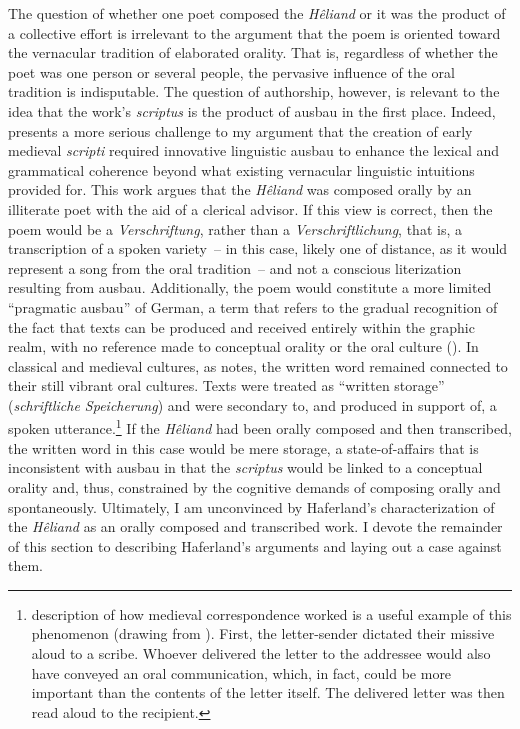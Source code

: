 The question of whether one poet composed the \textit{Hêliand} or it was the product of a collective effort is irrelevant to the argument that the poem is oriented toward the vernacular tradition of elaborated orality. That is, regardless of whether the poet was one person or several people, the pervasive influence of the oral tradition is indisputable. The question of authorship, however, is relevant to the idea that the work’s \textit{scriptus} is the product of ausbau in the first place. Indeed, \citet{Haferland2010} presents a more serious challenge to my argument that the creation of early medieval \textit{scripti} required innovative linguistic ausbau to enhance the lexical and grammatical coherence beyond what existing vernacular linguistic intuitions provided for. This work argues that the \textit{Hêliand} was composed orally by an illiterate poet with the aid of a clerical advisor. If this view is correct, then the poem would be a \textit{Verschriftung}, rather than a \textit{Verschriftlichung}, that is, a transcription of a spoken variety~-- in this case, likely one of distance, as it would represent a song from the oral tradition~-- and not a conscious literization resulting from ausbau. Additionally, the poem would constitute a more limited “pragmatic ausbau” of German, a term that refers to the gradual recognition of the fact that texts can be produced and received entirely within the graphic realm, with no reference made to conceptual orality or the oral culture (\citealt[590]{KochOesterreicher1994}). In classical and medieval cultures, as \citet[15--16]{Green1994} notes, the written word remained connected to their still vibrant oral cultures. Texts were treated as “written storage” (\textit{schriftliche Speicherung}) and were secondary to, and produced in support of, a spoken utterance.\footnote{ description of how medieval correspondence worked is a useful example of this phenomenon (drawing from \citealt[340]{Köhn1986}). First, the letter-sender dictated their missive aloud to a scribe. Whoever delivered the letter to the addressee would also have conveyed an oral communication, which, in fact, could be more important than the contents of the letter itself. The delivered letter was then read aloud to the recipient.} If the \textit{Hêliand} had been orally composed and then transcribed, the written word in this case would be mere storage, a state-of-affairs that is inconsistent with ausbau in that the \textit{scriptus} would be linked to a conceptual orality and, thus, constrained by the cognitive demands of composing orally and spontaneously. Ultimately, I am unconvinced by Haferland’s characterization of the \textit{Hêliand} as an orally composed and transcribed work. I devote the remainder of this section to describing Haferland’s arguments and laying out a case against them.

